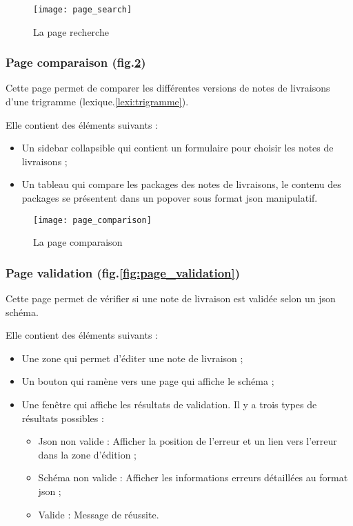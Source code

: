 \begin{figure}[ht]
 \centering
 \texttt{[image: page\_search]}
 \caption{La page recherche}
 \label{fig:page_search}
\end{figure}

\subsubsection{Page comparaison (fig.\ref{fig:page_comparaison})}
Cette page permet de comparer les différentes versions de notes de livraisons d'une trigramme (lexique.\ref{lexi:trigramme}).

Elle contient des éléments suivants :
\begin{itemize}
 \item Un sidebar collapsible qui contient un formulaire pour choisir les notes de livraisons ;
 \item Un tableau qui compare les packages des notes de livraisons, le contenu des packages se présentent dans un popover sous format json manipulatif.
\end{itemize}

\begin{figure}[ht]
 \centering
 \texttt{[image: page\_comparison]}
 \caption{La page comparaison}
 \label{fig:page_comparaison}
\end{figure}

\subsubsection{Page validation (fig.\ref{fig:page_validation})}
Cette page permet de vérifier si une note de livraison est validée selon un json schéma.

Elle contient des éléments suivants :
\begin{itemize}
 \item Une zone qui permet d'éditer une note de livraison ;
 \item Un bouton qui ramène vers une page qui affiche le schéma ;
 \item Une fenêtre qui affiche les résultats de validation. Il y a trois types de résultats possibles :
       \begin{itemize}
        \item Json non valide :
              Afficher la position de l'erreur et un lien vers l'erreur dans la zone d'édition ;
        \item Schéma non valide :
              Afficher les informations erreurs détaillées au format json ;
        \item Valide :
              Message de réussite.
       \end{itemize}
\end{itemize}

